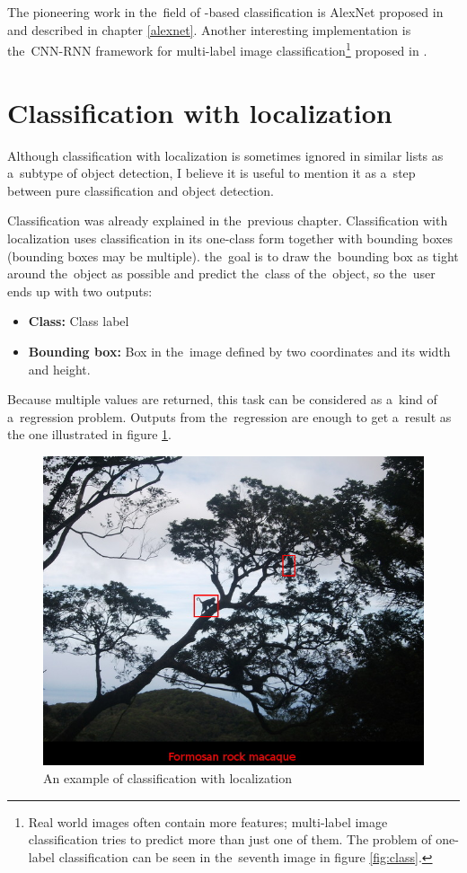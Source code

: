 The pioneering work in the~field of -based classification is AlexNet 
proposed in \cite{cnn-classification} and described in chapter \ref{alexnet}. 
Another interesting implementation is the~CNN-RNN framework for multi-label 
image classification\footnote{Real world images often contain more features; 
multi-label image classification tries to predict more than just one of them. 
The problem of one-label classification can be seen in the~seventh image in 
figure \ref{fig:class}.} proposed in \cite{multi-classification}.

\section{Classification with localization}
\label{classification-localization}

Although classification with localization is sometimes ignored in similar lists 
as a~subtype of object detection, I believe it is useful to mention it as a~step 
between pure classification and object detection.

Classification was already explained in the~previous chapter. Classification 
with localization uses classification in its one-class form together with 
bounding boxes (bounding boxes may be multiple). the~goal is to draw
the~bounding box as tight around the~object as possible and predict the~class of
the~object, so the~user ends up with two outputs:
\begin{itemize}
	\item \textbf{Class:} Class label
	\item \textbf{Bounding box:} Box in the~image defined by two coordinates and 
its width and height.
\end{itemize}

Because multiple values are returned, this task can be considered as a~kind of
a~regression problem. Outputs from the~regression are enough to get a~result as 
the one illustrated in figure \ref{fig:class-loc}. 

\begin{figure}[H]
   \centering
	\includegraphics[width=.7\linewidth]{./pictures/class-loc.JPG}
	\caption[Classification with localization example]{An example of classification 
with localization}
      \label{fig:class-loc}
\end{figure}

